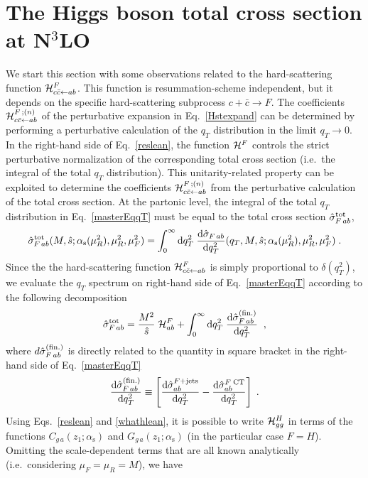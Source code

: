 \documentclass[12pt]{article}
\def\beeq{\begin{eqnarray}}
\def\eeeq{\end{eqnarray}}
\DeclareRobustCommand{\as}{\ensuremath{\alpha_{\mathrm{s}}}}
\newcommand\f[2]{\frac{#1}{#2}}
\def\to{\rightarrow}
\def\ito{\leftarrow}
\DeclareRobustCommand{\qt}{q_T}
\DeclareRobustCommand{\rd}{\ensuremath{\mathrm{d}}}
\begin{document}
\section{The Higgs boson total cross section at \texorpdfstring{N${}^\text{3}$LO}{N3LO}}
\label{sec:numforCN3}
We start this section with some observations related to the hard-scattering function ${\cal H}_{c{\bar c} \ito ab}^{F}$. This function is resummation-scheme independent, but it depends on the specific hard-scattering subprocess $c + {\bar c} \to F$. The coefficients ${\cal H}_{c{\bar c} \ito ab}^{F \,;(n)}$ of the perturbative expansion in Eq.~\eqref{Hstexpand} can be determined by performing a perturbative calculation of the $\qt$ distribution in the limit $\qt \to 0$. In the right-hand side of Eq.~\eqref{reslean},  the function ${\cal H}^{F}$ controls the strict perturbative normalization of the corresponding total cross section (i.e.\ the integral of the total $\qt$ distribution). This unitarity-related property can be exploited to determine the coefficients ${\cal H}_{c{\bar c} \ito ab}^{F \,;(n)}$ from the perturbative calculation of the total cross section.  At the partonic level, the integral of the total $\qt$ distribution in Eq.~\eqref{masterEqqT} must be equal to the total cross section ${\hat \sigma}_{F \,ab}^{{\rm {tot}}}$,
\begin{equation}
\label{restotp}
{\hat \sigma}_{F \,ab}^{{\rm {tot}}}(M,{\hat s};
\as(\mu_R^2),\mu_R^2,\mu_F^2)
 = \int_0^{\infty} \rd\qt^2 \;
\f{\rd{\hat \sigma}_{F \,ab}}{\rd \qt^2}(\qt,M,{\hat s};
\as(\mu_R^2),\mu_R^2,\mu_F^2) 
 \;.
\end{equation}
Since the the hard-scattering function ${\cal H}_{c{\bar c} \ito ab}^{F}$ is simply proportional to $\delta(\qt^{2})$, we evaluate the $\qt$ spectrum on right-hand side of Eq.~\eqref{masterEqqT} according to the following decomposition
\beeq
\label{sigtotrel} 
{\hat \sigma}_{F \,ab}^{{\rm {tot}}}
 = \f{M^2}{\hat s} \;{\cal H}_{ab}^F 
+ \int_0^{\infty} \rd\qt^2 \;
\f{\rd{\hat \sigma}_{F \,ab}^{(\rm fin.)}}{\rd \qt^2}  \;\;,
\eeeq
where $d{\hat \sigma}_{F \,ab}^{(\rm fin.)}$ is directly related to the quantity in square bracket in the right-hand side of Eq.~\eqref{masterEqqT}
\beeq
\label{sigfin}
\f{\rd{\hat \sigma}_{F \,ab}^{(\rm fin.)}}{\rd \qt^2} \equiv \left[ \f{\rd{\hat \sigma}_{ab}^{F+{\rm jets}}}{\rd \qt^2} - \f{\rd{\hat \sigma}_{ab}^{F\;{\rm CT}}}{\rd \qt^2}\right]\;.
\eeeq
Using Eqs.~\eqref{reslean} and \eqref{whathlean}, it is possible to write ${\cal H}_{gg}^H$ in terms of the functions $C_{g \,a}(z_1;\as)$ and $G_{g \,a}(z_1;\as)$ (in the particular case $F=H$). Omitting the scale-dependent terms that are all known analytically (i.e.\ considering $\mu_{F}=\mu_{R}=M$), we have 
\end{document}
